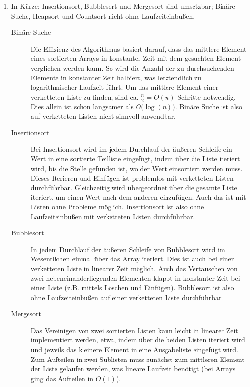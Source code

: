 \documentclass[11pt,a4paper]{article}
\begin{document}
\begin{loesung}
    \begin{enumerate}
        \item
        In Kürze:
        Insertionsort, Bubblesort und Mergesort sind umsetzbar;
        Binäre Suche, Heapsort und Countsort nicht ohne Laufzeiteinbußen.
        \begin{description}
            \item[Binäre Suche] Die Effizienz des Algorithmus basiert darauf, dass das mittlere Element eines sortierten Arrays in konstanter Zeit mit dem gesuchten Element verglichen werden kann.
            So wird die Anzahl der zu durchsuchenden Elemente in konstanter Zeit halbiert, was letztendlich zu logarithmischer Laufzeit führt.
            Um das mittlere Element einer verketteten Liste zu finden, sind ca. $\frac{n}{2} = O(n)$ Schritte notwendig.
            Dies allein ist schon langsamer als $O\big(\log(n)\big)$.
            Binäre Suche ist also auf verketteten Listen nicht sinnvoll anwendbar.
            \item[Insertionsort]
            Bei Insertionsort wird im jedem Durchlauf der äußeren Schleife ein Wert in eine sortierte Teilliste eingefügt, indem über die Liste iteriert wird, bis die Stelle gefunden ist, wo der Wert einsortiert werden muss.
            Dieses Iterieren und Einfügen ist problemlos mit verketteten Listen durchführbar.
            Gleichzeitig wird übergeordnet über die gesamte Liste iteriert, um einen Wert nach dem anderen einzufügen.
            Auch das ist mit Listen ohne Probleme möglich.
            Insertionsort ist also ohne Laufzeiteinbußen mit verketteten Listen durchführbar.
            \item[Bubblesort] In jedem Durchlauf der äußeren Schleife von Bubblesort wird im Wesentlichen einmal über das Array iteriert. 
            Dies ist auch bei einer verketteten Liste in linearer Zeit möglich.
            Auch das Vertauschen von zwei nebeneinanderliegenden Elementen klappt in konstanter Zeit bei einer Liste (z.B. mittels Löschen und Einfügen).
            Bubblesort ist also ohne Laufzeiteinbußen auf einer verketteten Liste durchführbar.
            \item[Mergesort] Das Vereinigen von zwei sortierten Listen kann leicht in linearer Zeit implementiert werden, etwa, indem über die beiden Listen iteriert wird und jeweils das kleinere Element in eine Ausgabeliste eingefügt wird.
            Zum Aufteilen in zwei Sublisten muss zunächst zum mittleren Element der Liste gelaufen werden, was lineare Laufzeit benötigt (bei Arrays ging das Aufteilen in $O(1)$).

\end{description}
\end{enumerate}
\end{loesung}
\end{document}
